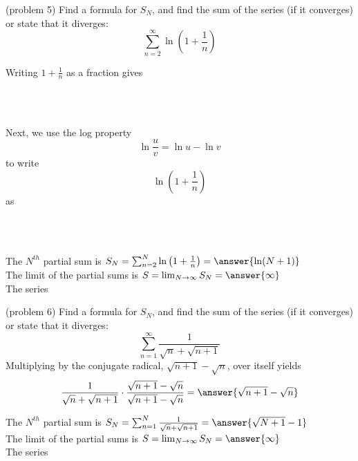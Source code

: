 \documentclass[handout]{ximera}
\begin{document}
\begin{problem}(problem 5)
Find a formula for $S_N$, and find the sum of the series (if it converges) or state that it diverges:
\[
\sum_{n=2}^\infty  \ln\left(1 + \frac{1}{n}\right) 
\]

Writing $1 + \frac{1}{n}$ as a fraction gives 
\begin{multipleChoice}
\\
\\
\end{multipleChoice}

Next, we use the log property 
\[
\ln\frac{u}{v} = \ln u - \ln v
\]
to write 
\[
\ln\left(1 + \frac{1}{n}\right)
\]
as 
\begin{multipleChoice}
\\
\\
\end{multipleChoice}

The $N^{th}$ partial sum is  $S_N = \sum_{n=2}^N \ln\left(1 + \frac{1}{n}\right) 
 =  \answer{\ln(N+1)}$\\

The limit of the partial sums is $S = \lim_{N\to \infty}S_N = \answer{\infty}$\\

The series 

\end{problem}


\begin{problem}(problem 6)
Find a formula for $S_N$, and find the sum of the series (if it converges) or state that it diverges:
\[
\sum_{n=1}^\infty  \frac{1}{\sqrt n + \sqrt{n+1}} 
\]
Multiplying by the conjugate radical, $\sqrt{n+1} - \sqrt{n}$, over itself yields
\[
\frac{1}{\sqrt n + \sqrt{n+1}} \cdot \frac{\sqrt{n+1} - \sqrt{n}}{\sqrt{n+1} - \sqrt{n}} = \answer{\sqrt{n+1} -\sqrt{n}}
\]

The $N^{th}$ partial sum is  $S_N = \sum_{n=1}^N \frac{1}{\sqrt n + \sqrt{n+1}} 
 =  \answer{\sqrt{N+1} - 1}$\\

The limit of the partial sums is $S = \lim_{N\to \infty}S_N = \answer{\infty}$\\

The series 

\end{problem}
\end{document}
